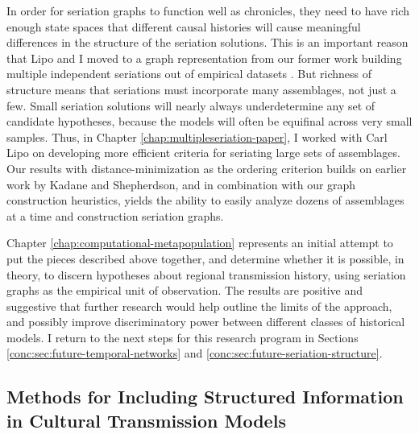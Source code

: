 In order for seriation graphs to function well as chronicles, they need to have rich enough state spaces that different causal histories will cause meaningful differences in the structure of the seriation solutions.  This is an important reason that Lipo and I moved to a graph representation from our former work building multiple independent seriations out of empirical datasets \citep{Lipo2015}.  But richness of structure means that seriations must incorporate many assemblages, not just a few.  Small seriation solutions will nearly always underdetermine any set of candidate hypotheses, because the models will often be equifinal across very small samples.  Thus, in Chapter \ref{chap:multipleseriation-paper}, I worked with Carl Lipo on developing more efficient criteria for seriating large sets of assemblages.  Our results with distance-minimization as the ordering criterion builds on earlier work by Kadane and Shepherdson, and in combination with our graph construction heuristics, yields the ability to easily analyze dozens of assemblages at a time and construction seriation graphs.  

Chapter \ref{chap:computational-metapopulation} represents an initial attempt to put the pieces described above together, and determine whether it is possible, in theory, to discern hypotheses about regional transmission history, using seriation graphs as the empirical unit of observation.  The results are positive and suggestive that further research would help outline the limits of the approach, and possibly improve discriminatory power between different classes of historical models.  I return to the next steps for this research program in Sections \ref{conc:sec:future-temporal-networks} and \ref{conc:sec:future-seriation-structure}.   

\subsection{Methods for Including Structured Information in Cultural Transmission Models}\label{conc:sec:conc-structured}


